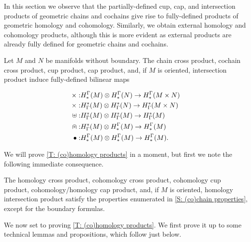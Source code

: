 In this section we observe that the partially-defined cup, cap, and intersection products of geometric chains and cochains give rise to fully-defined products of geometric homology and cohomology. Similarly, we obtain external homology and cohomology products, although this is more evident as external products are already fully defined for geometric chains and cochains.

\begin{theorem}\label{T: (co)homology products}
Let $M$ and $N$ be manifolds without boundary. The chain cross product, cochain cross product, cup product, cap product, and, if $M$ is oriented, intersection product induce fully-defined bilinear maps

\begin{align*}
\times:& H^\Gamma_*(M)\otimes H^\Gamma_*(N)\to H^\Gamma_*(M\times N)\\
\times:& H_\Gamma^*(M)\otimes H_\Gamma^*(N)\to H_\Gamma^*(M\times N)\\
\uplus:& H_\Gamma^*(M)\otimes H_\Gamma^*(M)\to H_\Gamma^*(M)\\
\nplus:& H_\Gamma^*(M)\otimes H^\Gamma_*(M)\to H^\Gamma_*(M)\\
\bullet:& H^\Gamma_*(M)\otimes H^\Gamma_*(M)\to H^\Gamma_*(M).\\
\end{align*}
\end{theorem}

We will prove \cref{T: (co)homology products} in a moment, but first we note the following immediate consequence.
\begin{theorem}
The homology cross product, cohomology cross product, cohomology cup product, cohomology/homology cap product, and, if $M$ is oriented, homology intersection product satisfy the properties enumerated in \cref{S: (co)chain properties}, except for the boundary formulas.
\end{theorem}



We now set to proving \cref{T: (co)homology products}. We first prove it up to some technical lemmas and propositions, which follow just below.

